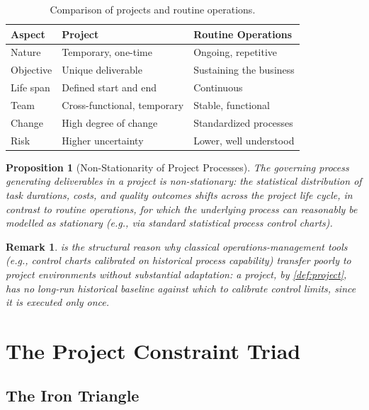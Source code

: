\documentclass[12pt, a4paper]{report}
\theoremstyle{engnotes}
\newtheorem{prop}{Proposition}[section]
\newtheorem{remark}{Remark}[section]
\begin{document}
\begin{table}[H]
    \centering
    \caption{Comparison of projects and routine operations.}
    \label{tab:project_vs_operations}
    \begin{tabularx}{\textwidth}{l X X}
        \toprule
        \textbf{Aspect} & \textbf{Project} & \textbf{Routine Operations} \\
        \midrule
        Nature & Temporary, one-time & Ongoing, repetitive \\
        Objective & Unique deliverable & Sustaining the business \\
        Life span & Defined start and end & Continuous \\
        Team & Cross-functional, temporary & Stable, functional \\
        Change & High degree of change & Standardized processes \\
        Risk & Higher uncertainty & Lower, well understood \\
        \bottomrule
    \end{tabularx}
\end{table}

\begin{prop}[Non-Stationarity of Project Processes]\label{prop:nonstationarity}
    The governing process generating deliverables in a project is non-stationary: the statistical distribution of task durations, costs, and quality outcomes shifts across the project life cycle, in contrast to routine operations, for which the underlying process can reasonably be modelled as stationary (e.g., via standard statistical process control charts).
\end{prop}

\begin{remark}
     is the structural reason why classical operations-management tools (e.g., control charts calibrated on historical process capability) transfer poorly to project environments without substantial adaptation: a project, by \cref{def:project}, has no long-run historical baseline against which to calibrate control limits, since it is executed only once.
\end{remark}

\section{The Project Constraint Triad}
\label{sec:constraint_triad}

\subsection{The Iron Triangle}
\label{subsec:iron_triangle}
\end{document}

